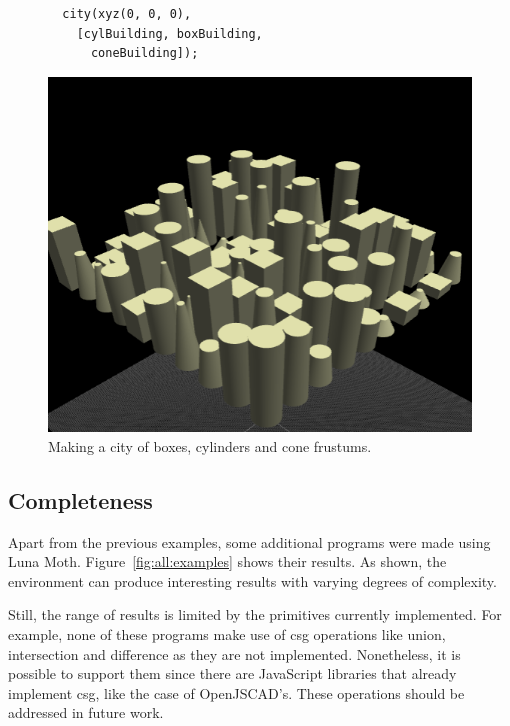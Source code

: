 \begin{figure}
\begin{minipage}{0.5\textwidth}
\begin{verbatim}
  city(xyz(0, 0, 0),
    [cylBuilding, boxBuilding,
      coneBuilding]);
\end{verbatim}
\end{minipage}%
\begin{minipage}{0.5\textwidth}
  \includegraphics[width=1.0\textwidth]{./images/detail_examples/box_cyl_city_higher_crop}
\end{minipage}
\caption{Making a city of boxes, cylinders and cone frustums.}
\label{fig:cyl:box:cone:city}
\end{figure}


\subsection{Completeness}
Apart from the previous examples, some additional programs were made using Luna Moth.
Figure~\ref{fig:all:examples} shows their results.
As shown, the environment can produce interesting results with varying degrees of complexity.

Still, the range of results is limited by the primitives currently implemented.
For example, none of these programs make use of \gls{csg} operations like union, intersection and difference as they are not implemented.
Nonetheless, it is possible to support them since there are JavaScript libraries that already implement \gls{csg}, like the case of OpenJSCAD's.
These operations should be addressed in future work.

